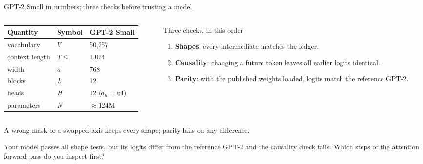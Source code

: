 \documentclass[handout]{beamer}
\begin{document}
\begin{frame}{GPT-2 Small in numbers; three checks before trusting a model}
  \begin{columns}[t]
    \begin{column}{0.46\linewidth}
      \centering\footnotesize
      \begin{tabular}{@{}lll@{}}
        \toprule
        Quantity & Symbol & GPT-2 Small \\
        \midrule
        vocabulary & $V$ & 50{,}257 \\
        context length & $T \le$ & 1{,}024 \\
        width & $d$ & 768 \\
        blocks & $L$ & 12 \\
        heads & $H$ & 12 ($d_h=64$) \\
        \midrule
        parameters & $N$ & $\approx 124$M \\
        \bottomrule
      \end{tabular}
    \end{column}
    \begin{column}{0.50\linewidth}
      \begin{alertblock}{Three checks, in this order}
        \footnotesize
        \begin{enumerate}
            \setlength{\itemsep}{2pt}
          \item \textbf{Shapes}: every intermediate matches the ledger.
          \item \textbf{Causality}: changing a future token leaves all earlier logits identical.
          \item \textbf{Parity}: with the published weights loaded, logits match the reference GPT-2.
        \end{enumerate}
      \end{alertblock}
    \end{column}
  \end{columns}
  \vfill
  \footnotesize A wrong mask or a swapped axis keeps every shape; parity fails on any difference.
\end{frame}

{Your model passes all shape tests, but its logits differ from the reference GPT-2 and the causality check fails. Which steps of the attention forward pass do you inspect first?}
\end{document}
